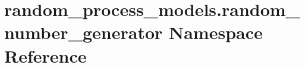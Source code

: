 \hypertarget{namespacerandom__process__models_1_1random__number__generator}{}\section{random\+\_\+process\+\_\+models.\+random\+\_\+number\+\_\+generator Namespace Reference}
\label{namespacerandom__process__models_1_1random__number__generator}

